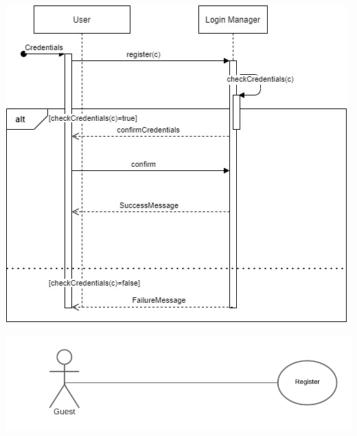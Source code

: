 \documentclass[a4paper, 10pt, oneside]{article}
\begin{document}
\begin{minipage}{\linewidth}
            \centering
           \includegraphics[height=0.5\textheight, scale=1, keepaspectratio]{img/seq_diag/Register.jpg}
\end{minipage}

\begin{minipage}{\linewidth}
            \centering
           \includegraphics[height=0.1\textheight, scale=0.2, keepaspectratio]{img/registration_use_case_diagram.png}
\end{minipage}
\end{document}
